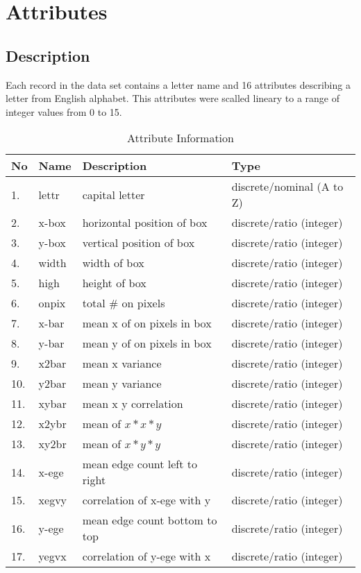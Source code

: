 \chapter*{Attributes}
\section*{Description}
\setcounter{chapter}{1}
Each record in the data set contains a letter name and 16 attributes describing
a letter from English alphabet. This attributes were scalled lineary to a range
of integer values from 0 to 15.

\begin{table}[ht!]
    \centering
    \begin{tabular}{|l|l|l|l|}
         \hline
             No & Name & Description & Type \\ \hline
             1. & lettr & capital letter             & discrete/nominal (A to Z)  \\ \hline
             2. & x-box & horizontal position of box & discrete/ratio (integer)   \\ \hline
             3. & y-box & vertical position of box   & discrete/ratio (integer)   \\ \hline
             4. & width & width of box               & discrete/ratio (integer)   \\ \hline
             5. & high  & height of box              & discrete/ratio (integer)   \\ \hline
             6. & onpix & total \# on pixels         & discrete/ratio (integer)   \\ \hline
             7. & x-bar & mean x of on pixels in box & discrete/ratio (integer)   \\ \hline
             8. & y-bar & mean y of on pixels in box & discrete/ratio (integer)   \\ \hline
             9. & x2bar & mean x variance            & discrete/ratio (integer)   \\ \hline
            10. & y2bar & mean y variance            & discrete/ratio (integer)   \\ \hline
            11. & xybar & mean x y correlation       & discrete/ratio (integer)   \\ \hline
            12. & x2ybr & mean of $x * x * y$        & discrete/ratio (integer)   \\ \hline
            13. & xy2br & mean of $x * y * y$        & discrete/ratio (integer)   \\ \hline
            14. & x-ege & mean edge count left to right  & discrete/ratio (integer) \\ \hline
            15. & xegvy & correlation of x-ege with y    & discrete/ratio (integer) \\ \hline
            16. & y-ege & mean edge count bottom to top  & discrete/ratio (integer) \\ \hline
            17. & yegvx & correlation of y-ege with x    & discrete/ratio (integer) \\ \hline
    \end{tabular}
    \caption{Attribute Information}
\end{table}

